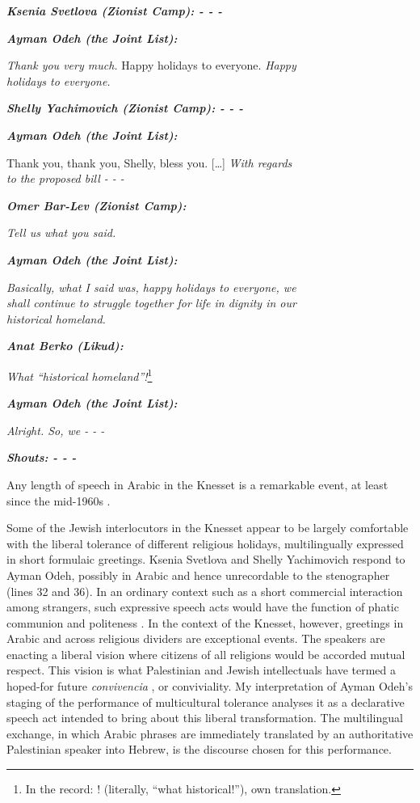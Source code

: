 \documentclass[output=paper,arabicfont]{langscibook}
\begin{document}
\begin{exe}
\begin{linenumbers*}
\textbf{\textit{Ksenia Svetlova (Zionist Camp): - - - }}

\textbf{\textit{Ayman Odeh (the Joint List):}}

\textit{Thank you very much.} Happy holidays to everyone. \textit{Happy\\
holidays to everyone.}

\textbf{\textit{Shelly Yachimovich (Zionist Camp): - - -}}

\textbf{\textit{Ayman Odeh (the Joint List):}}

Thank you, thank you, Shelly, bless you. […] \textit{With regards\\
to the proposed bill - - -}

\textit{\textbf{Omer Bar-Lev (Zionist Camp):}}

\textit{Tell us what you said.}

\textbf{\textit{Ayman Odeh (the Joint List):}}

\textit{Basically, what I said was, happy holidays to everyone, we \\
shall continue to struggle together for life in dignity in our \\
historical homeland.}

\textbf{\textit{Anat Berko (Likud):}}

\textit{What “historical homeland”!}\footnote{
In the record: !
 (literally, “what historical!”), own translation.}
 
\textbf{\textit{Ayman Odeh (the Joint List):}}

\textit{Alright. So, we - - -}

\textbf{\textit{Shouts: - - -}}

\end{linenumbers*}
\end{exe}

Any length of speech in Arabic in the Knesset is a remarkable event, at least since the mid-1960s \citep[36–39]{hawker2019a}.

Some of the Jewish interlocutors in the Knesset appear to be largely comfortable with the liberal tolerance of different religious holidays, multilingually expressed in short formulaic greetings. Ksenia Svetlova and Shelly Yachimovich respond to Ayman Odeh, possibly in Arabic and hence unrecordable to the stenographer  (lines 32 and 36). In an ordinary context such as a short commercial interaction among strangers, such expressive speech acts would have the function of phatic communion and politeness \citep{amer2020a}. In the context of the Knesset, however, greetings in Arabic and across religious dividers are exceptional events. The speakers are enacting a liberal vision where citizens of all religions would be accorded mutual respect. This vision is what Palestinian and Jewish intellectuals have termed a hoped-for future \textit{convivencia} \citep[24, 33]{shohat2017a}, or conviviality. My interpretation of Ayman Odeh’s staging of the performance of multicultural tolerance analyses it as a declarative speech act intended to bring about this liberal transformation. The multilingual exchange, in which Arabic phrases are immediately translated by an authoritative Palestinian speaker into Hebrew, is the discourse chosen for this performance.
\end{document}

